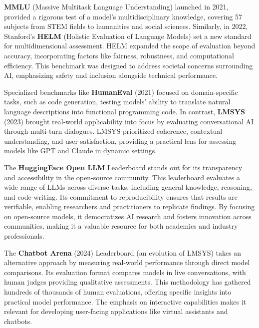 \textbf{MMLU} (Massive Multitask Language Understanding)  launched in 2021, provided a rigorous test of a model's multidisciplinary knowledge, covering 57 subjects from STEM fields to humanities and social sciences. Similarly, in 2022, Stanford's \textbf{HELM} (Holistic Evaluation of Language Models)  set a new standard for multidimensional assessment. HELM expanded the scope of evaluation beyond accuracy, incorporating factors like fairness, robustness, and computational efficiency. This benchmark was designed to address societal concerns surrounding AI, emphasizing safety and inclusion alongside technical performance. 

Specialized benchmarks like \textbf{HumanEval} (2021)  focused on domain-specific tasks, such as code generation, testing models' ability to translate natural language descriptions into functional programming code. In contrast, \textbf{LMSYS} (2023) brought real-world applicability into focus by evaluating conversational AI through multi-turn dialogues. LMSYS prioritized coherence, contextual understanding, and user satisfaction, providing a practical lens for assessing models like GPT and Claude in dynamic settings.

The \textbf{HuggingFace Open LLM}  Leaderboard stands out for its transparency and accessibility in the open-source community. This leaderboard evaluates a wide range of LLMs across diverse tasks, including general knowledge, reasoning, and code-writing. Its commitment to reproducibility ensures that results are verifiable, enabling researchers and practitioners to replicate findings. By focusing on open-source models, it democratizes AI research and fosters innovation across communities, making it a valuable resource for both academics and industry professionals.

The \textbf{Chatbot Arena} (2024) Leaderboard (an evolution of LMSYS)  takes an alternative approach by measuring real-world performance through direct model comparisons. Its evaluation format compares models in live conversations, with human judges providing qualitative assessments. This methodology has gathered hundreds of thousands of human evaluations, offering specific insights into practical model performance. The emphasis on interactive capabilities makes it relevant for developing user-facing applications like virtual assistants and chatbots.

